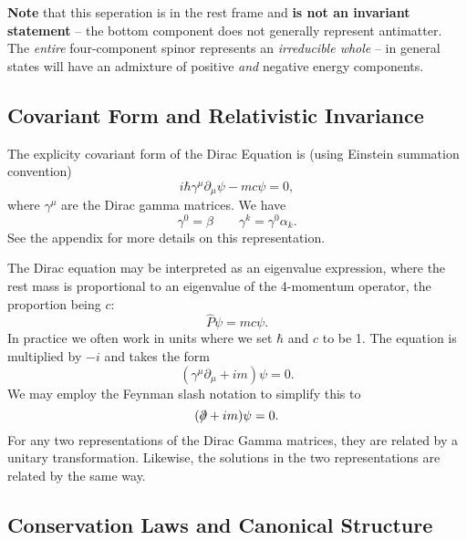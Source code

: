 \textbf{Note} that this seperation is in the rest frame and \textbf{is not an invariant statement} -- the bottom component does not generally represent antimatter. The \emph{entire} four-component spinor represents an \emph{irreducible whole} -- in general states will have an admixture of positive \emph{and} negative energy components.

\subsection{Covariant Form and Relativistic Invariance}

The explicity covariant form of the Dirac Equation is (using Einstein summation convention)
\begin{equation}
i\hbar\gamma^\mu\partial_\mu\psi - mc\psi = 0,
\end{equation}
where $\gamma^\mu$ are the Dirac gamma matrices. We have
\begin{equation}
\gamma^0 = \beta \qquad \gamma^k = \gamma^0\alpha_k.
\end{equation}
See the appendix for more details on this representation.

The Dirac equation may be interpreted as an eigenvalue expression, where the rest mass is proportional to an eigenvalue of the 4-momentum operator, the proportion being $c$:
\begin{equation}
\hat{P}\psi = mc\psi.
\end{equation}
In practice we often work in units where we set $\hbar$ and $c$ to be 1. The equation is multiplied by $-i$ and takes the form
\begin{equation}
\left(\gamma^\mu\partial_\mu + im \right)\psi = 0.
\end{equation}
We may employ the Feynman slash notation to simplify this to
\begin{equation}
(\slashchar{\partial} + im)\psi = 0. 
\end{equation}
For any two representations of the Dirac Gamma matrices, they are related by a unitary transformation. Likewise, the solutions in the two representations are related by the same way.


\subsection{Conservation Laws and Canonical Structure}

